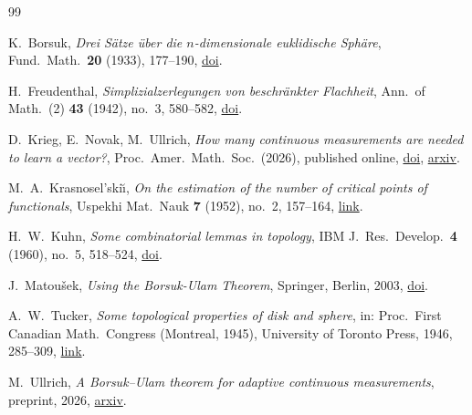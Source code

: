\bpbibheading
\begin{thebibliography}{99}

K.~Borsuk,
\emph{Drei S\"atze \"uber die $n$-dimensionale euklidische Sph\"are},
Fund.\ Math.\ \textbf{20} (1933), 177--190,
\href{https://doi.org/10.4064/fm-20-1-177-190}{doi}.

H.~Freudenthal,
\emph{Simplizialzerlegungen von beschr\"ankter Flachheit},
Ann.\ of Math.\ (2) \textbf{43} (1942), no.~3, 580--582,
\href{https://doi.org/10.2307/1968813}{doi}.

D.~Krieg, E.~Novak, M.~Ullrich,
\emph{How many continuous measurements are needed to learn a vector?},
Proc.\ Amer.\ Math.\ Soc.\ (2026), published online,
\href{https://doi.org/10.1090/proc/17901}{doi},
\href{https://arxiv.org/abs/2412.06468}{arxiv}.

M.~A.~Krasnosel'ski\u{\i},
\emph{On the estimation of the number of critical points of functionals},
Uspekhi Mat.\ Nauk \textbf{7} (1952), no.~2, 157--164,
\href{https://www.mathnet.ru/eng/rm8306}{link}.

H.~W.~Kuhn,
\emph{Some combinatorial lemmas in topology},
IBM J.\ Res.\ Develop.\ \textbf{4} (1960), no.~5, 518--524,
\href{https://doi.org/10.1147/rd.45.0518}{doi}.

J.~Matou\v{s}ek,
\emph{Using the Borsuk-Ulam Theorem},
Springer, Berlin, 2003,
\href{https://doi.org/10.1007/978-3-540-76649-0}{doi}.

A.~W.~Tucker,
\emph{Some topological properties of disk and sphere},
in: Proc.\ First Canadian Math.\ Congress (Montreal, 1945),
University of Toronto Press, 1946, 285--309,
\href{https://zbmath.org/3102257}{link}.

M.~Ullrich,
\emph{A Borsuk--Ulam theorem for adaptive continuous measurements},
preprint, 2026,
\href{https://arxiv.org/abs/2610.33781}{arxiv}.

\end{thebibliography}
